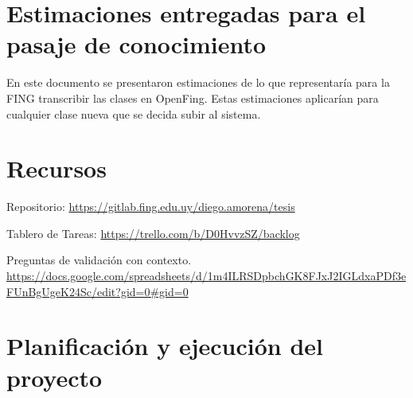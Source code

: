 \documentclass{prgrado}
\begin{document}
\begin{appendix}





\chapter{Estimaciones entregadas para el pasaje de conocimiento}
En este documento se presentaron estimaciones de lo que representaría para la FING transcribir las clases en OpenFing. Estas estimaciones aplicarían para cualquier clase nueva que se decida subir al sistema. 




% 

\chapter{Recursos}
\label{anexos-Recursos}

Repositorio: %
\url{https://gitlab.fing.edu.uy/diego.amorena/tesis}

Tablero de Tareas:
\url{https://trello.com/b/D0HvvzSZ/backlog}

Preguntas de validación con contexto.
\url{https://docs.google.com/spreadsheets/d/1m4ILRSDpbchGK8FJxJ2IGLdxaPDf3eFUnBgUgeK24Sc/edit?gid=0#gid=0}

\chapter{Planificación y ejecución del proyecto}



\end{appendix}
\end{document}
